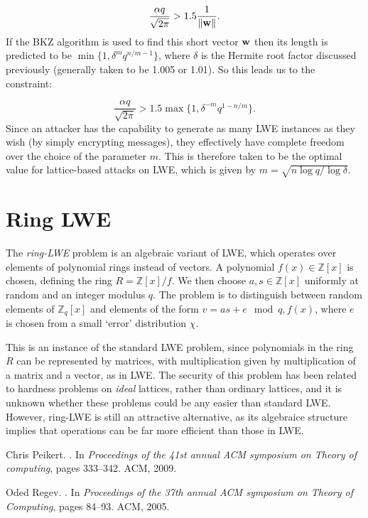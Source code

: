 \documentclass[11pt]{article}
\begin{document}
\[ \frac{\alpha q}{\sqrt{2\pi}} > 1.5 \frac{1}{\Vert \mathbf{w} \Vert}. \]
%
If the BKZ algorithm is used to find this short vector $\mathbf{w}$ then its length
is predicted to be $\min\{1, \delta^m q^{n/m-1}\}$, where $\delta$ is the Hermite
root factor discussed previously (generally taken to be 1.005 or 1.01).
So this leads us to the constraint:

\[ \frac{\alpha q}{\sqrt{2\pi}} > 1.5 \max\{1, \delta^{-m}q^{1 - n/m}\}. \]
%
Since an attacker has the capability to generate as many LWE instances as they
wish (by simply encrypting messages), they effectively have complete freedom over the choice
of the parameter $m$. This is therefore taken to be the optimal value for
lattice-based attacks on LWE, which is given by $m = \sqrt{n \log{q}/\log{\delta}}$.

\section{Ring LWE}

The \textit{ring-LWE} problem is an algebraic variant of LWE, which operates
over elements of polynomial rings instead of vectors. A polynomial $f(x) \in \mathbb{Z}[x]$
is chosen, defining the ring $R = \mathbb{Z}[x]/f$. We then choose $a,s \in \mathbb{Z}[x]$
uniformly at random and an integer modulus $q$. The problem is to distinguish
between random elements of $\mathbb{Z}_q[x]$ and elements of the form
$v = as + e \mod{q, f(x)}$, where $e$ is chosen from a small `error' distribution
$\chi$.

This is an instance of the standard LWE problem, since polynomials in the ring
$R$ can be represented by matrices, with multiplication given by multiplication
of a matrix and a vector, as in LWE. The security of this problem has been
related to hardness problems on \textit{ideal} lattices, rather than ordinary
lattices, and it is unknown whether these problems could be any easier than
standard LWE. However, ring-LWE is still an attractive alternative, as its
algebraice structure implies that operations can be far more efficient than
those in LWE.

\begin{thebibliography}{Reg09}

Chris Peikert.
.
\newblock In {\em Proceedings of the 41st annual ACM symposium on Theory of
  computing}, pages 333--342. ACM, 2009.

Oded Regev.
.
\newblock In {\em Proceedings of the 37th annual ACM symposium on Theory of
  Computing}, pages 84--93. ACM, 2005.

\end{thebibliography}


\end{document}
